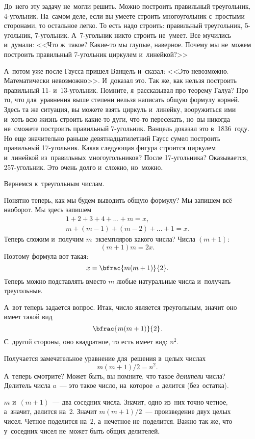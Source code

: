 До~него эту задачу не~могли решить. Можно построить правильный треугольник, 4-угольник. На~самом
деле, если вы умеете строить многоугольник с~простыми сторонами, то остальное легко. То есть надо
строить: правильный треугольник, 5-угольник, 7-угольник. А~7-угольник никто строить
не~умеет. Все мучились и~думали: <<Что ж~такое? Какие-то мы глупые, наверное. Почему мы не~можем
построить правильный 7-угольник циркулем и~линейкой?>>

А~потом уже после Гаусса пришел Ванцель и~сказал: <<Это невозможно. Математически невозможно>>. И~доказал это. Так же, как нельзя построить правильный
11- и~13-угольник. Помните, я~рассказывал про теорему Галуа? Про то, что для~уравнения выше
 степени нельзя написать общую формулу корней. Здесь та же ситуация, вы можете взять циркуль
и~линейку, вооружиться ими и~хоть всю жизнь строить какие-то дуги, что-то пересекать, но~вы никогда
не~сможете построить правильный 7-угольник. Ванцель доказал это в~1836~году. Но еще значительно
раньше девятнадцатилетний Гаусс сумел построить правильный 17-угольник. Какая следующая фигура строится циркулем и~линейкой
из~правильных многоугольников? После 17-угольника? Оказывается, 257-угольник. Это очень
долго и~сложно, но~можно.

Вернемся к~треугольным числам.

Понятно теперь, как мы будем выводить общую формулу? Мы запишем всё наоборот. Мы здесь запишем
\begin{gather*}
1+2+3+4+\ldots+m=x,\\
m+(m-1)+(m-2)+\ldots+1=x.
\end{gather*}
Теперь сложим и~получим $m$~экземпляров какого числа? Числа $(m+1)$:
$$
(m+1)m=2x.
$$
Поэтому формула вот такая:
$$
x=\bfrac{m(m+1)}{2}.
$$
Теперь можно подставлять вместо $m$ любые натуральные числа и~получать треугольные.

А~вот теперь задается вопрос. Итак, число является треугольным, значит оно имеет такой вид
$$
\bfrac{m(m+1)}{2}.
$$
С~другой стороны, оно квадратное, то есть имеет вид: $n^{2}$.

Получается замечательное уравнение для~решения в~целых числах
$$
m(m+1)/2=n^{2}.
$$
А~теперь смотрите? Может быть, вы помните, что такое \textit{делители} числа? Делитель числа $a$~---
это такое число, на~которое~$a$ делится (без~остатка).

$m$ и~$(m+1)$~--- два соседних числа. Значит, одно из~них точно четное, а~значит, делится на~2.
Значит $m(m+1)/2$~--- произведение двух целых чисел. Четное поделится на~2, а~нечетное не~поделится.
Важно так же, что у~соседних чисел не~может быть общих делителей.

